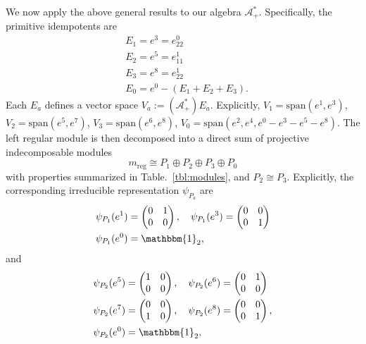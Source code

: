 \documentclass[prx, twocolumn, superscriptaddress, dvipsnames]{revtex4-2}
\theoremstyle{definition}
\newcommand{\bo}{\mathbbm{1}}
\newcommand{\mA}{\mathcal{A}}
\newcommand{\reg}{\text{reg}}
\begin{document}
We now apply the above general results to our algebra $\mA^*_+$. Specifically, the primitive idempotents are 
\begin{equation}
\begin{aligned}
   & E_1 = e^3 = e^0_{22} \\
   & E_2 = e^5 = e^1_{11} \\ 
   & E_3 = e^8 = e^1_{22} \\
   & E_0 = e^0 - (E_1+E_2+E_3).
\end{aligned}
\end{equation}
Each $E_a$ defines a vector space $V_a:=(\mA^*_+) E_a$. Explicitly, $V_1=\mathrm{span}(e^1,e^3)$, $V_2=\mathrm{span}(e^5,e^7)$, $V_3=\mathrm{span}(e^6,e^8)$, $V_0=\mathrm{span}(e^2,e^4,e^0-e^3-e^5-e^8)$.
The left regular module is then decomposed into a direct sum of projective indecomposable modules
\begin{equation}
   m_\reg \cong P_1 \oplus P_2 \oplus P_3 \oplus P_0
\end{equation}
with properties summarized in Table.~\ref{tbl:modules}, and $P_2\cong P_3$. Explicitly, the corresponding irreducible representation $\psi_{P_a}$ are
\begin{equation}
\begin{aligned}
    &\psi_{P_1}(e^1)=\begin{pmatrix}
        0 & 1\\
        0 & 0
    \end{pmatrix},\quad 
    \psi_{P_1}(e^3)=\begin{pmatrix}
        0 & 0\\
        0 & 1
    \end{pmatrix}\\
    &\psi_{P_1}(e^0)=\bo_2,
\end{aligned}
\end{equation}
and
\begin{equation}
\begin{aligned}
    &\psi_{P_2}(e^5) = \begin{pmatrix}
        1 & 0\\
        0 & 0
    \end{pmatrix},\quad \psi_{P_2}(e^6) = \begin{pmatrix}
        0 & 1\\
        0 & 0
    \end{pmatrix}\\
    &\psi_{P_2}(e^7) = \begin{pmatrix}
        0 & 0\\
        1 & 0
    \end{pmatrix},\quad \psi_{P_2}(e^8) = \begin{pmatrix}
        0 & 0\\
        0 & 1
    \end{pmatrix},\\
    &\psi_{P_2}(e^0)=\bo_2,
\end{aligned}
\end{equation}
\end{document}
